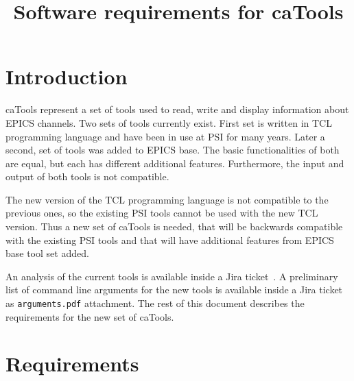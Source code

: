 \documentclass[12pt,a4paper]{article}
\title{Software requirements for caTools}
\date{}
\begin{document}
\maketitle


\section{Introduction}
caTools represent a set of tools used to read, write and display information about EPICS channels. Two sets of tools currently exist. First set is written in TCL programming language and have been in use at PSI for many years. Later a second, set of tools was added to EPICS base. The basic functionalities of both are equal, but each has different additional features. Furthermore, the input and output of both tools is not compatible. 

The new version of the TCL programming language is not compatible to the previous ones, so the existing PSI tools cannot be used with the new TCL version. Thus a new set of caTools is needed, that will be backwards compatible with the existing PSI tools and that will have additional features from EPICS base tool set added.

An analysis of the current tools is available inside a Jira ticket~\cite{jira_analyze}. A preliminary list of command line arguments for the new tools is available inside a Jira ticket~\cite{jira_requirements} as \texttt{arguments.pdf} attachment. The rest of this document describes the requirements for the new set of caTools.

\section{Requirements}
\end{document}
